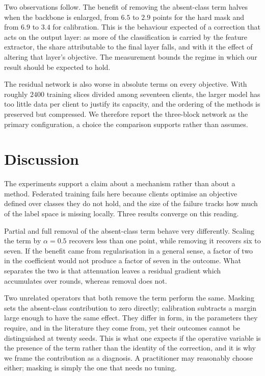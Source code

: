 \documentclass[journal]{IEEEtran}
\begin{document}
Two observations follow. The benefit of removing the absent-class term halves
when the backbone is enlarged, from $6.5$ to $2.9$ points for the hard mask and
from $6.9$ to $3.4$ for calibration. This is the behaviour expected of a
correction that acts on the output layer: as more of the classification is
carried by the feature extractor, the share attributable to the final layer
falls, and with it the effect of altering that layer's objective. The
measurement bounds the regime in which our result should be expected to hold.

The residual network is also worse in absolute terms on every objective. With
roughly $2400$ training slices divided among seventeen clients, the larger model
has too little data per client to justify its capacity, and the ordering of the
methods is preserved but compressed. We therefore report the three-block network
as the primary configuration, a choice the comparison supports rather than
assumes.

\section{Discussion}

The experiments support a claim about a mechanism rather than about a method.
Federated training fails here because clients optimise an objective defined over
classes they do not hold, and the size of the failure tracks how much of the
label space is missing locally. Three results converge on this reading.

Partial and full removal of the absent-class term behave very differently.
Scaling the term by $\alpha=0.5$ recovers less than one point, while removing it
recovers six to seven. If the benefit came from regularisation in a general
sense, a factor of two in the coefficient would not produce a factor of seven in
the outcome. What separates the two is that attenuation leaves a residual
gradient which accumulates over rounds, whereas removal does not.

Two unrelated operators that both remove the term perform the same. Masking sets
the absent-class contribution to zero directly; calibration subtracts a margin
large enough to have the same effect. They differ in form, in the parameters
they require, and in the literature they come from, yet their outcomes cannot be
distinguished at twenty seeds. This is what one expects if the operative
variable is the presence of the term rather than the identity of the correction,
and it is why we frame the contribution as a diagnosis. A practitioner may
reasonably choose either; masking is simply the one that needs no tuning.
\end{document}
